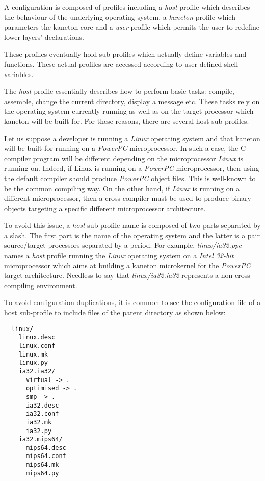 A configuration is composed of profiles including a \textit{host} profile which
describes the behaviour of the underlying operating system, a \textit{kaneton}
profile which parameters the kaneton core and a \textit{user} profile which
permits the user to redefine lower layers' declarations.

These profiles eventually hold sub-profiles which actually define variables
and functions. These actual profiles are accessed according to user-defined
shell variables.



The \textit{host} profile essentially describes how to perform basic tasks:
compile, assemble, change the current directory, display a message etc. These
tasks rely on the operating system currently running as well as on the target
processor which kaneton will be built for. For these reasons, there are
several host sub-profiles.

Let us suppose a developer is running a \textit{Linux} operating system and
that kaneton will be built for running on a \textit{PowerPC} microprocessor. In
such a case, the C compiler program will be different depending on the
microprocessor \textit{Linux} is running on. Indeed, if Linux is running on
a \textit{PowerPC} microprocessor, then using the default compiler should
produce \textit{PowerPC} object files. This is well-known to be the common
compiling way. On the other hand, if \textit{Linux} is running on a
different microprocessor, then a cross-compiler must be used to produce
binary objects targeting a specific different microprocessor architecture.

To avoid this issue, a \textit{host} sub-profile name is composed of two parts
separated by a slash. The first part is the name of the operating system and
the latter is a pair source/target processors separated by a period. For
example, \textit{linux/ia32.ppc} names a \textit{host} profile running the
\textit{Linux} operating system on a \textit{Intel 32-bit} microprocessor
which aims at building a kaneton microkernel for the \textit{PowerPC}
target architecture. Needless to say that \textit{linux/ia32.ia32} represents
a non cross-compiling environment.

To avoid configuration duplications, it is common to see the configuration
file of a host sub-profile to include files of the parent directory as
shown below:

\begin{verbatim}
  linux/
    linux.desc
    linux.conf
    linux.mk
    linux.py
    ia32.ia32/
      virtual -> .
      optimised -> .
      smp -> .
      ia32.desc
      ia32.conf
      ia32.mk
      ia32.py
    ia32.mips64/
      mips64.desc
      mips64.conf
      mips64.mk
      mips64.py
\end{verbatim}

